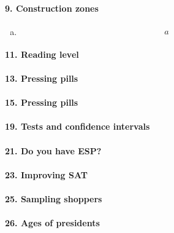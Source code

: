 \documentclass[../Homework]{subfiles}
\begin{document}
		\paragraph{9. Construction zones}
			\begin{enumerate}[a.]
				\item
					\begin{align*}
						a
					\end{align*}
			\end{enumerate}
		\paragraph{11. Reading level}
		\paragraph{13. Pressing pills}
		\paragraph{15. Pressing pills}
		\paragraph{19. Tests and confidence intervals}
		\paragraph{21. Do you have ESP?}
		\paragraph{23. Improving SAT}
		\paragraph{25. Sampling shoppers}
		\paragraph{26. Ages of presidents}
\end{document}
